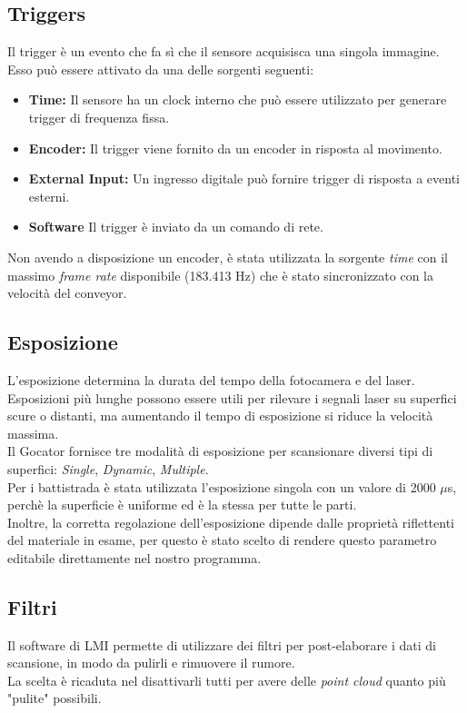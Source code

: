 \subsection{Triggers}
Il trigger è un evento che fa sì che il sensore acquisisca una singola immagine.\\

Esso può essere attivato da una delle sorgenti seguenti:

\begin{itemize}
	\item \textbf{Time:} Il sensore ha un clock interno che può essere utilizzato per generare trigger di frequenza fissa.
	\item \textbf{Encoder:} Il trigger viene fornito da un encoder in risposta al movimento.
	\item \textbf{External Input:} Un ingresso digitale può fornire trigger di risposta a eventi esterni.
	\item \textbf{Software} Il trigger è inviato da un comando di rete.
\end{itemize}

\noindent Non avendo a disposizione un encoder, è stata utilizzata la sorgente \textit{time} con il massimo \textit{frame rate} disponibile (183.413 Hz) che è stato sincronizzato con la velocità del conveyor.

\subsection{Esposizione}
L'esposizione determina la durata del tempo della fotocamera e del laser. Esposizioni più lunghe possono essere utili per rilevare i segnali laser su superfici scure o distanti, ma aumentando il tempo di esposizione si riduce la velocità massima.\\
\newline
Il Gocator fornisce tre modalità di esposizione per scansionare diversi tipi di superfici: \textit{Single}, \textit{Dynamic}, \textit{Multiple}.\\
Per i battistrada è stata utilizzata l'esposizione singola con un valore di 2000 $\mu$s, perchè la superficie è uniforme ed è la stessa per tutte le parti.\\
\newline
Inoltre, la corretta regolazione dell'esposizione dipende dalle proprietà riflettenti del materiale in esame, per questo è stato scelto di rendere questo parametro editabile direttamente nel nostro programma.

\subsection{Filtri}
Il software di LMI permette di utilizzare dei filtri per post-elaborare i dati di scansione, in modo da pulirli e rimuovere il rumore.\\
La scelta è ricaduta nel disattivarli tutti per avere delle \textit{point cloud} quanto più "pulite" possibili.

